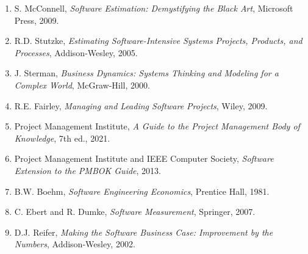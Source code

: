 \begin{enumerate}
  \item S. McConnell, \textit{Software Estimation: Demystifying the Black Art}, Microsoft Press, 2009.
  \item R.D. Stutzke, \textit{Estimating Software-Intensive Systems Projects, Products, and Processes}, Addison-Wesley, 2005.
  \item J. Sterman, \textit{Business Dynamics: Systems Thinking and Modeling for a Complex World}, McGraw-Hill, 2000.
  \item R.E. Fairley, \textit{Managing and Leading Software Projects}, Wiley, 2009.
  \item Project Management Institute, \textit{A Guide to the Project Management Body of Knowledge}, 7th ed., 2021.
  \item Project Management Institute and IEEE Computer Society, \textit{Software Extension to the PMBOK Guide}, 2013.
  \item B.W. Boehm, \textit{Software Engineering Economics}, Prentice Hall, 1981.
  \item C. Ebert and R. Dumke, \textit{Software Measurement}, Springer, 2007.
  \item D.J. Reifer, \textit{Making the Software Business Case: Improvement by the Numbers}, Addison-Wesley, 2002.
\end{enumerate}
